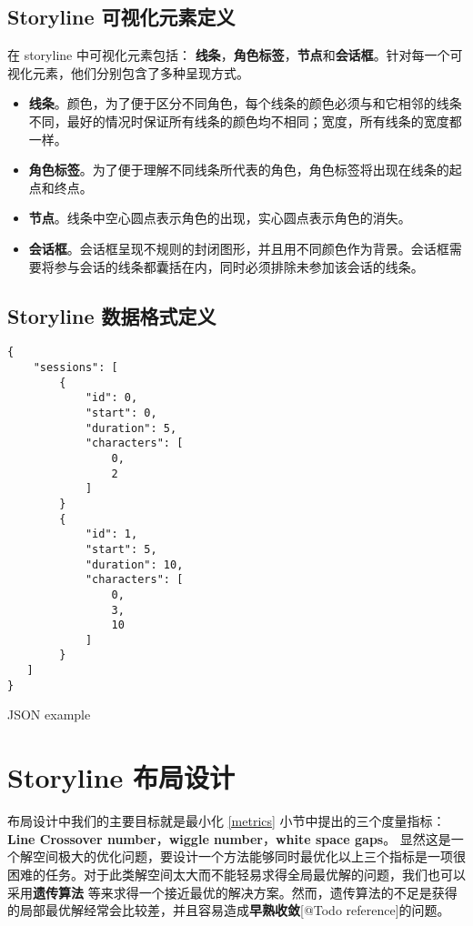 \subsection{Storyline 可视化元素定义}
在 storyline 中可视化元素包括： \textbf{线条}，\textbf{角色标签}，\textbf{节点}和\textbf{会话框}。针对每一个可视化元素，他们分别包含了多种呈现方式。
\begin{itemize}
\item \textbf{线条}。颜色，为了便于区分不同角色，每个线条的颜色必须与和它相邻的线条不同，最好的情况时保证所有线条的颜色均不相同；宽度，所有线条的宽度都一样。
\item \textbf{角色标签}。为了便于理解不同线条所代表的角色，角色标签将出现在线条的起点和终点。
\item \textbf{节点}。线条中空心圆点表示角色的出现，实心圆点表示角色的消失。
\item \textbf{会话框}。会话框呈现不规则的封闭图形，并且用不同颜色作为背景。会话框需要将参与会话的线条都囊括在内，同时必须排除未参加该会话的线条。
\end{itemize}


\subsection{Storyline 数据格式定义}
\begin{listing}
\begin{verbatim}
{
    "sessions": [
        {
            "id": 0,
            "start": 0,
            "duration": 5,
            "characters": [
                0,
                2
            ]
        }
        {
            "id": 1,
            "start": 5,
            "duration": 10,
            "characters": [
                0,
                3,
                10
            ]
        }
   ]
}
\end{verbatim}
\caption{JSON example} 
\label{json-example}
\end{listing}

\section{Storyline 布局设计}
布局设计中我们的主要目标就是最小化 \ref{metrics} 小节中提出的三个度量指标：\textbf{Line Crossover number}，\textbf{wiggle number}，\textbf{white space gaps}。 显然这是一个解空间极大的优化问题，要设计一个方法能够同时最优化以上三个指标是一项很困难的任务。对于此类解空间太大而不能轻易求得全局最优解的问题，我们也可以采用\textbf{遗传算法}\cite{tanahashi2012design} 等来求得一个接近最优的解决方案。然而，遗传算法的不足是获得的局部最优解经常会比较差，并且容易造成\textbf{早熟收敛}[@Todo reference]的问题。

